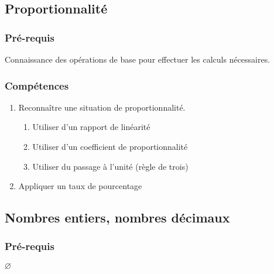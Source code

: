 \subsection{Proportionnalité}\label{ch_6_proba}

\subsubsection*{Pré-requis}
Connaissance des opérations de base pour effectuer les calculs nécessaires.

\subsubsection*{Compétences}

\begin{enumerate}

	\item Reconnaître une situation de proportionnalité.

		\begin{enumerate}
			\item Utiliser d'un rapport de linéarité
			\item Utiliser d'un coefficient de proportionnalité
			\item Utiliser du passage à l'unité (règle de trois)		
		\end{enumerate}
	\item Appliquer un taux de pourcentage
\end{enumerate}


\subsection{Nombres entiers, nombres décimaux}\label{ch_6_nombres}

\subsubsection*{Pré-requis}

$\varnothing$

